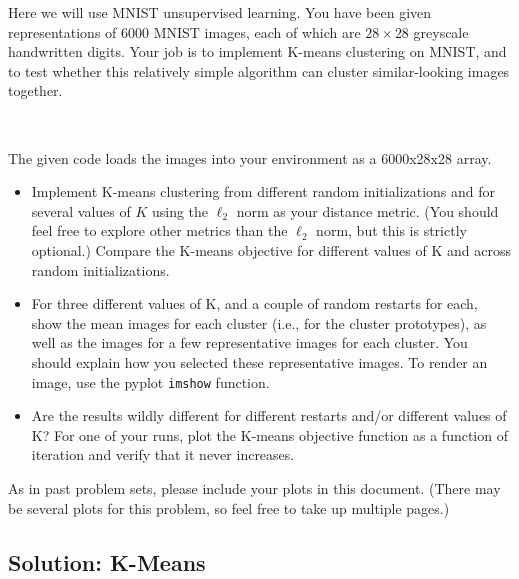 \documentclass[submit]{harvardml}
\begin{document}
Here we will use MNIST unsupervised learning. You have been given representations of 6000 MNIST
images, each of which are $28\times28$ greyscale handwritten digits. Your job is to implement
K-means clustering on MNIST, and to test whether this relatively simple algorithm can cluster
similar-looking images together.

~
\begin{problem}
The given code loads the images into your environment as a 6000x28x28 array.

\begin{itemize}
    \item Implement K-means clustering
        from different random initializations and for several values of $K$ using the $\ell_2$ norm
        as your distance metric. (You should feel free to explore other metrics than the $\ell_2$
        norm, but this is strictly optional.)  Compare the K-means objective for different values of
        K and across random initializations.
%
\item For three different values of K,
    and a couple of random restarts for each, show the mean images for each cluster (i.e., for the
    cluster prototypes), as well as the images for a few representative images for each cluster. You
    should explain how you selected these representative images. To render an image, use the pyplot
    \texttt{imshow} function. 

\item Are the results wildly different for different restarts and/or different values of K?  For one
    of your runs, plot the K-means objective function as a function of iteration and verify that it
    never increases.

\end{itemize}


As in past problem sets, please include your plots in this
document. (There may be several plots for this problem, so feel free
to take up multiple pages.)




\end{problem}
\subsection*{Solution: K-Means}
\end{document}
